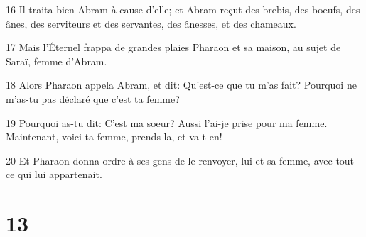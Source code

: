 \par 16 Il traita bien Abram à cause d'elle; et Abram reçut des brebis, des boeufs, des ânes, des serviteurs et des servantes, des ânesses, et des chameaux.
\par 17 Mais l'Éternel frappa de grandes plaies Pharaon et sa maison, au sujet de Saraï, femme d'Abram.
\par 18 Alors Pharaon appela Abram, et dit: Qu'est-ce que tu m'as fait? Pourquoi ne m'as-tu pas déclaré que c'est ta femme?
\par 19 Pourquoi as-tu dit: C'est ma soeur? Aussi l'ai-je prise pour ma femme. Maintenant, voici ta femme, prends-la, et va-t-en!
\par 20 Et Pharaon donna ordre à ses gens de le renvoyer, lui et sa femme, avec tout ce qui lui appartenait.

\chapter{13}

